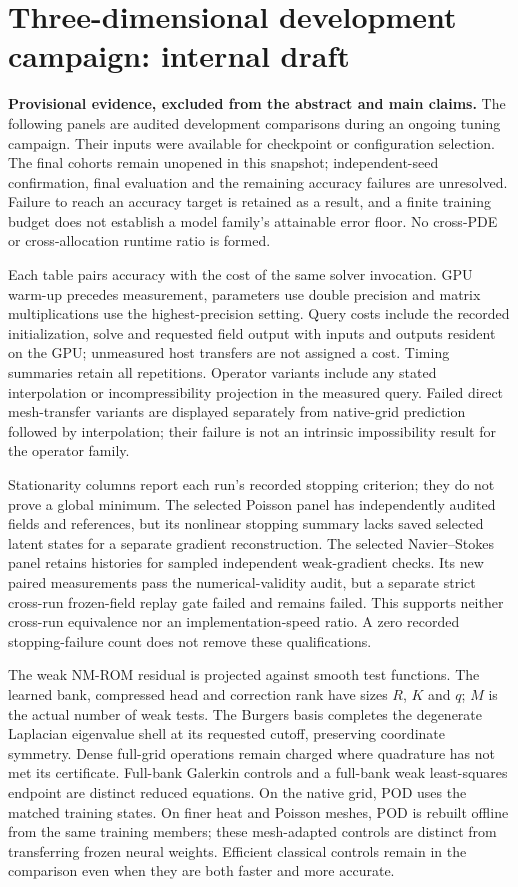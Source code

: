 \clearpage
\section{Three-dimensional development campaign: internal draft}
\label{app:campaign-development}

\textbf{Provisional evidence, excluded from the abstract and main claims.}
The following panels are audited development comparisons during an
ongoing tuning campaign. Their inputs were available for checkpoint or
configuration selection. The final cohorts remain unopened in this
snapshot; independent-seed confirmation, final evaluation and the
remaining accuracy failures are unresolved. Failure to reach an accuracy
target is retained as a result, and a finite training budget does not
establish a model family's attainable error floor. No cross-PDE or
cross-allocation runtime ratio is formed.

Each table pairs accuracy with the cost of the same solver invocation.
GPU warm-up precedes measurement, parameters use double precision and
matrix multiplications use the highest-precision setting. Query costs
include the recorded initialization, solve and requested field output
with inputs and outputs resident on the GPU; unmeasured host transfers
are not assigned a cost. Timing summaries retain all repetitions.
Operator variants include any stated interpolation or incompressibility
projection in the measured query. Failed direct mesh-transfer variants
are displayed separately from native-grid prediction followed by
interpolation; their failure is not an intrinsic impossibility result
for the operator family.

Stationarity columns report each run's recorded stopping criterion;
they do not prove a global minimum. The selected Poisson panel has
independently audited fields and references, but its nonlinear stopping
summary lacks saved selected latent states for a separate gradient
reconstruction. The selected Navier--Stokes panel retains histories for
sampled independent weak-gradient checks. Its new paired measurements
pass the numerical-validity audit, but a separate strict cross-run
frozen-field replay gate failed and remains failed. This supports neither
cross-run equivalence nor an implementation-speed ratio. A zero recorded
stopping-failure count does not remove these qualifications.

The weak NM-ROM residual is projected against smooth test functions.
The learned bank, compressed head and correction rank have sizes
$R$, $K$ and $q$; $M$ is the actual number of weak tests. The Burgers
basis completes the degenerate Laplacian eigenvalue shell at its
requested cutoff, preserving coordinate symmetry. Dense full-grid
operations remain charged where quadrature has not met its certificate.
Full-bank Galerkin controls and a full-bank weak least-squares endpoint
are distinct reduced equations. On the native grid, POD uses the matched
training states. On finer heat and Poisson meshes, POD is rebuilt offline
from the same training members; these mesh-adapted controls are distinct
from transferring frozen neural weights.
Efficient classical controls remain in the comparison even when they
are both faster and more accurate.

